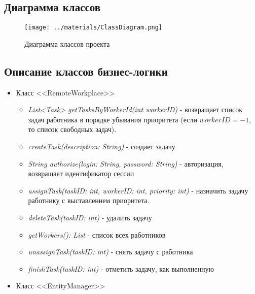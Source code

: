 \subsection{Диаграмма классов}
	\begin{figure}[H]
		\centering
		\texttt{[image: ../materials/ClassDiagram.png]}
		\caption{Диаграмма классов проекта}
		\label{fig:ClassDiag}
	\end{figure}
	
\subsection{Описание классов бизнес-логики}
	\begin{itemize}
		\item Класс <<RemoteWorkplace>>
			\begin{itemize}
					 
				\item \textit{List<Task> getTasksByWorkerId(int workerID)} - возвращает список задач работника в порядке убывания приоритета (если $workerID=-1$, то список свободных задач).
				
				\item \textit{createTask(description: String)} - создает задачу
				
				\item \textit{String authorize(login: String, password: String)} - авторизация, возвращает идентификатор сессии
				
				\item \textit{assignTask(taskID: int, workerID: int, priority: int) } - назначить задачу работнику с выставлением приоритета.
				
				\item \textit{deleteTask(taskID: int)} - удалить задачу
				
				\item \textit{getWorkers(): List} - список всех работников
				
				\item \textit{unassignTask(taskID: int)} - снять задачу с работника
								
				\item \textit{finishTask(taskID: int)} - отметить задачу, как выполненную 
				
			\end{itemize}	
		\item Класс <<EntityManager>>
		\begin{itemize}
			

\end{itemize}
\end{itemize}
